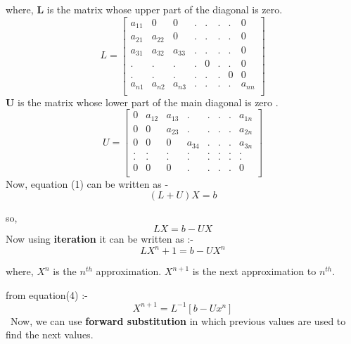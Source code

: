 \documentclass{article}
\begin{document}
where,\linebreak
\hspace*{10mm} \textbf {L}  is the matrix whose upper part of the  diagonal is zero.\linebreak
\[ L=
\begin{bmatrix}
a_{11} & 0 & 0 & . & . & . & . & 0\\
a_{21} & a_{22} & 0 & . & . & . & . & 0\\
a_{31} & a_{32} & a_{33} & . & . & . & . & 0\\
. & . & . & . & 0 & . & . & 0\\ 
. & . & . & . & . & . & 0 & 0\\
a_{n1} & a_{n2} & a_{n3} & . & . & . & . & a_{nn}\\ 

\end{bmatrix}
\]
\hspace*{13mm}\textbf{U} is the matrix whose lower part of the main diagonal is zero .\linebreak
\[ U =
\begin{bmatrix}
0 & a_{12} & a_{13} & . & . & . & . & a_{1n}\\
0 & 0 & a_{23} & . & . & . & . & a_{2n}\\
0 & 0 & 0 & a_{34} & . & . & . & a_{3n}\\
. & . & . & . & . & . & . & .\\ 
. & . & . & . & . & . & . & .\\
0 & 0 & 0 & . & . & . & . & 0\\ 
\end{bmatrix}
\]
Now, equation (1) can  be written as -
\begin{equation} \label{eq3}
( L + U)X =  b
\end{equation}

so,\linebreak
\[ LX= b - UX\]
Now using \textbf{iteration } it can be written as :-
\begin{equation} \label{eq4}
LX^n+1 = b- UX^n
\end{equation}

where,\linebreak 
\hspace*{10mm}\textbf{$X^n$} is the $n^{th}$ approximation. \linebreak 
\hspace*{10mm}\textbf{$X^{n+1}$} is the next approximation to $n^{th}$. \linebreak

from equation(4) :-
\begin{equation}\label{5}
X^{n+1} = L^{-1} [ b - U x^{n}] 
\end{equation}\
Now, we can use \textbf{ forward substitution} in which  previous values are used to find the next values.
\end{document}
